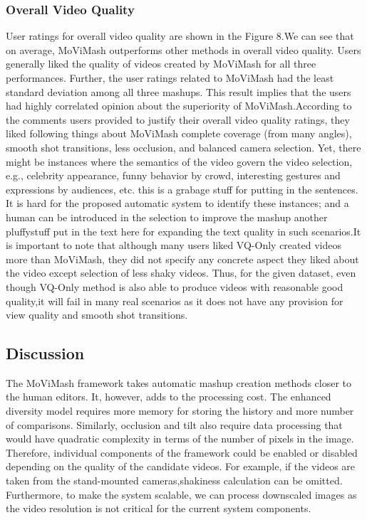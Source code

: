 \documentclass{sig-alternate}
\begin{document}
\subsubsection{Overall Video Quality}
User ratings for overall video quality are shown in the Figure 8.We can see that on average, MoViMash outperforms other methods in overall video quality. Users generally liked the quality of videos created by MoViMash for all three performances. Further, the user ratings related to MoViMash had the least standard deviation among all three mashups. This result implies that the users had highly correlated opinion about the superiority of MoViMash.According to the comments users provided to justify their overall video quality ratings, they liked following things about MoViMash complete coverage (from many angles), smooth shot transitions, less occlusion, and balanced camera selection. Yet, there might be instances where the semantics of the video govern the video selection, e.g., celebrity appearance, funny behavior by crowd, interesting gestures and expressions by audiences, etc. this is a grabage stuff for putting in the sentences. It is hard for the proposed automatic system to identify these instances; and a human can be introduced in the selection to improve the mashup another pluffystuff put in the text here for expanding the text quality in such scenarios.It is important to note that although many users liked VQ-Only created videos more than MoViMash, they did not specify any concrete aspect they liked about the video except selection of less shaky videos. Thus, for the given dataset, even though VQ-Only
method is also able to produce videos with reasonable good quality,it will fail in many real scenarios as it does not have any provision for view quality and smooth shot transitions.
\subsection{Discussion}
The MoViMash framework takes automatic mashup creation methods closer to the human editors. It, however, adds to the processing cost. The enhanced diversity model requires more memory for storing the history and more number of comparisons. Similarly, occlusion and tilt also require data processing that would have quadratic complexity in terms of the number of pixels in the image. Therefore, individual components of the framework could be enabled or disabled depending on the quality of the candidate videos. For example, if the videos are taken from the stand-mounted cameras,shakiness calculation can be omitted. Furthermore, to make the system scalable, we can process downscaled images as the video resolution is not critical for the current system components.
\end{document}
